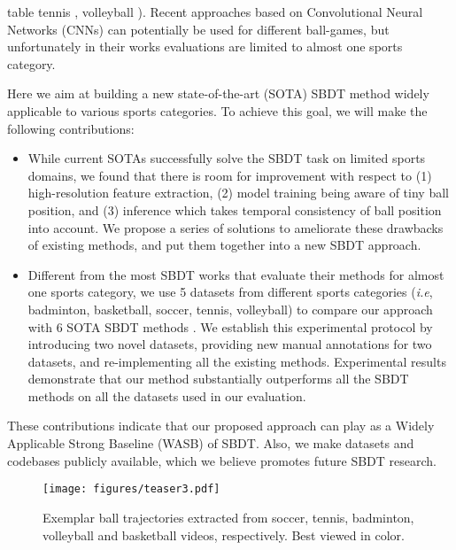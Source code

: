 \documentclass{bmvc2k}
\def\ie{\emph{i.e}\bmvaOneDot}
\begin{document}
table tennis \cite{zaveri+2004icme,desai+2005prmi,abed+2006acivs,chen+2006cesa,zhang+2010tim,zhang+2011zus,glover+2014icra,myint+2015mva},
volleyball \cite{chen+2007icassp,chen2012mta,cheng+2015pcm,cheng+2016icassp}).
Recent approaches \cite{komorowski+2019mva,komorowski+2020visapp,zandycke+2019mmsports,huang+2019avss,sun+2020icpai,liu+2022cvprw} based on Convolutional Neural Networks (CNNs) can potentially be used for different ball-games, but unfortunately in their works evaluations are limited to almost one sports category.
\par
Here we aim at building a new state-of-the-art (SOTA) SBDT method widely applicable to various sports categories.
To achieve this goal, we will make the following contributions:
\begin{itemize}
    \item While current SOTAs \cite{komorowski+2019mva,komorowski+2020visapp,zandycke+2019mmsports,huang+2019avss,sun+2020icpai,liu+2022cvprw} successfully solve the SBDT task on limited sports domains, we found that there is room for improvement with respect to (1) high-resolution feature extraction, (2) model training being aware of tiny ball position, and (3) inference which takes temporal consistency of ball position into account. We propose a series of solutions to ameliorate these drawbacks of existing methods, and put them together into a new SBDT approach.
    \item Different from the most SBDT works that evaluate their methods for almost one sports category, we use 5 datasets from different sports categories (\ie, badminton, basketball, soccer, tennis, volleyball) to compare our approach with 6 SOTA SBDT methods \cite{komorowski+2019mva,zandycke+2019mmsports,sun+2020icpai,liu+2022cvprw}. We establish this experimental protocol by introducing two novel datasets, providing new manual annotations for two datasets, and re-implementing all the existing methods. Experimental results demonstrate that our method substantially outperforms all the SBDT methods on all the datasets used in our evaluation.
\end{itemize}
\noindent
These contributions indicate that our proposed approach can play as a Widely Applicable Strong Baseline (WASB) of SBDT.
Also, we make datasets and codebases publicly available, which we believe promotes future SBDT research.
\begin{figure*}[t]
\centering
\texttt{[image: figures/teaser3.pdf]}
\caption{Exemplar ball trajectories extracted from soccer, tennis, badminton, volleyball and basketball videos, respectively. Best viewed in color.}
\label{fig:task}
\vspace*{-5mm}
\end{figure*}
\end{document}
